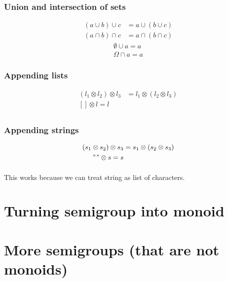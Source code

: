 \documentclass{article}
\begin{document}
    \subsubsection{Union and intersection of sets}

    \begin{align*}
        (a \cup b) \cup c &= a \cup (b \cup c) \\
        (a \cap b) \cap c &= a \cap (b \cap c)
    \end{align*}
    \begin{align*}
        \emptyset \cup a = a \\
        \Omega    \cap a = a 
    \end{align*}

    \subsubsection{Appending lists}

    \begin{align*}
        (l_1 \otimes l_2) \otimes l_3 &= l_1 \otimes (l_2 \otimes l_3) \\
        [] \otimes l = l \\
    \end{align*}

    \subsubsection{Appending strings}

    \begin{align*}
        (s_1 \otimes s_2) \otimes s_3 &= s_1 \otimes (s_2 \otimes s_3) \\
        "" \otimes s = s \\
    \end{align*}

    \paragraph{}
    This works because we can treat string as list of characters.

    \section{Turning semigroup into monoid}

    \section{More semigroups (that are not monoids)}
\end{document}
